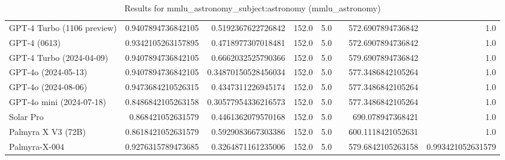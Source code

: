 \begin{table}[htp]
{\begin{tabular}{lrrrrrrr}
GPT-4 Turbo (1106 preview) & 0.9407894736842105 & 0.5192367622726842 & 152.0 & 5.0 &  & 572.6907894736842 & 1.0 \\
GPT-4 (0613) & 0.9342105263157895 & 0.4718977307018481 & 152.0 & 5.0 &  & 572.6907894736842 & 1.0 \\
GPT-4 Turbo (2024-04-09) & 0.9407894736842105 & 0.6662032525790366 & 152.0 & 5.0 &  & 579.6907894736842 & 1.0 \\
GPT-4o (2024-05-13) & 0.9407894736842105 & 0.34870150528456034 & 152.0 & 5.0 &  & 577.3486842105264 & 1.0 \\
GPT-4o (2024-08-06) & 0.9473684210526315 & 0.4347311226945174 & 152.0 & 5.0 &  & 577.3486842105264 & 1.0 \\
GPT-4o mini (2024-07-18) & 0.8486842105263158 & 0.30577954336216573 & 152.0 & 5.0 &  & 577.3486842105264 & 1.0 \\
Solar Pro & 0.868421052631579 & 0.4461362079570168 & 152.0 & 5.0 &  & 690.078947368421 & 1.0 \\
Palmyra X V3 (72B) & 0.8618421052631579 & 0.5929083667303386 & 152.0 & 5.0 &  & 600.1118421052631 & 1.0 \\
Palmyra-X-004 & 0.9276315789473685 & 0.3264871161235006 & 152.0 & 5.0 &  & 579.6842105263158 & 0.993421052631579 \\
\bottomrule
\end{tabular}}
\caption{Results for mmlu_astronomy_subject:astronomy (mmlu_astronomy)}
\label{fig:mmlu_astronomy_subject:astronomy (mmlu_astronomy)}
\end{table}